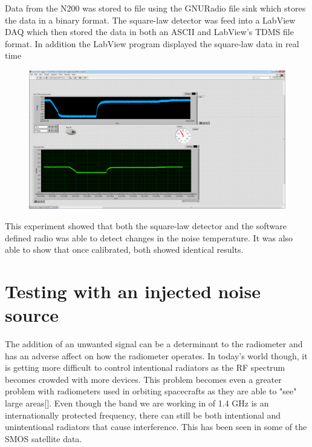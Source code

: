 Data from the N200 was stored to file using the GNURadio file sink which stores the data in a binary format.  The square-law detector was feed into a LabView DAQ which then stored the data in both an ASCII and LabView's TDMS file format.  In addition the LabView program displayed the square-law data in real time

\begin{figure}[h!tb] \centering

\includegraphics[width=\textwidth]{Images/labviewx2_lab0.png}

\label{labview_tpr}
\end{figure}

This experiment showed that both the square-law detector and the software defined radio was able to detect changes in the noise temperature.  It was also able to show that once calibrated, both showed identical results.

\section{Testing with an injected noise source}
The addition of an unwanted signal can be a determinant to the radiometer and has an adverse affect on how the radiometer operates.  In today's world though, it is getting more difficult to control intentional radiators as the RF spectrum becomes crowded with more devices.  This problem becomes even a greater problem with radiometers used in orbiting spacecrafts as they are able to "see" large areas[\cite{DeRooRFI}].  Even though the band we are working in of 1.4 GHz is an internationally protected frequency, there can still be both intentional and unintentional radiators that cause interference.  This has been seen in some of the SMOS satellite data.

